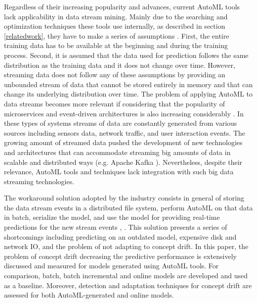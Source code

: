 \documentclass{sig-alternate-br}
\begin{document}
Regardless of their increasing popularity and advances, current AutoML tools lack applicability in data stream mining. Mainly due to the searching and optimization techniques these tools use internally, as described in section \ref{relatedwork}, they have to make a series of assumptions \cite{madrid2019towards}. First, the entire training data has to be available at the beginning and during the training process. Second, it is assumed that the data used for prediction follows the same distribution as the training data and it does not change over time. However, streaming data does not follow any of these assumptions by providing an unbounded stream of data that cannot be stored entirely in memory and that can change its underlying distribution over time. The problem of applying AutoML to data streams becomes more relevant if considering that the popularity of microservices and event-driven architectures is also increasing considerably \cite{richards2015microservices}. In these types of systems streams of data are constantly generated from various sources including sensors data, network traffic, and user interaction events. The growing amount of streamed data pushed the development of new technologies and architectures that can accommodate streaming big amounts of data in scalable and distributed ways (e.g. Apache Kafka \cite{kreps2011kafka}). Nevertheless, despite their relevance, AutoML tools and techniques lack integration with such big data streaming technologies.

The workaround solution adopted by the industry consists in general of storing the data stream events in a distributed file system, perform AutoML on that data in batch, serialize the model, and use the model for providing real-time predictions for the new stream events \cite{uber2017michelangelo}, \cite{gcTables}. This solution presents a series of shortcomings including predicting on an outdated model, expensive disk and network IO, and the problem of not adapting to concept drift. In this paper, the problem of concept drift decreasing the predictive performance is extensively discussed and measured for models generated using AutoML tools. For comparison, batch, batch incremental and online models are developed and used as a baseline. Moreover, detection and adaptation techniques for concept drift are assessed for both AutoML-generated and online models. 
\end{document}
